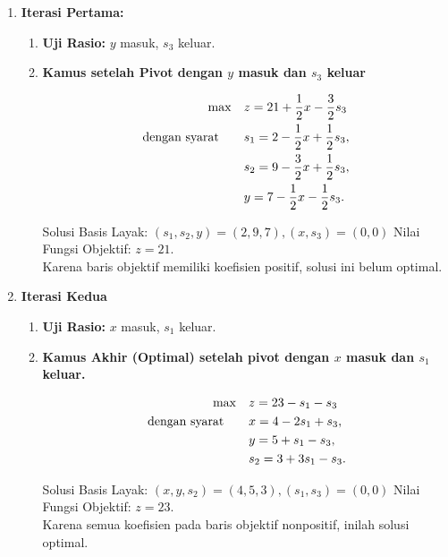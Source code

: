 \begin{enumerate}
    \item \textbf{Iterasi Pertama:}
\begin{enumerate}
    \item \textbf{Uji Rasio:} \( y \) masuk, \( s_3 \) keluar.

    \item \textbf{Kamus setelah Pivot dengan \( y \) masuk dan \( s_3 \) keluar}  
    \begin{tcolorbox}[colback=blue!5!white, colframe=blue!75!black,    
    width=0.6\textwidth, %
    box align=center, 
    title=\textbf{Kamus Kedua}]
    \[
    \begin{aligned}
    \max \quad & z = 21 + \frac{1}{2}x - \frac{3}{2}s_3 \\
    \mbox{dengan syarat}\quad \quad 
    & s_1 = 2 - \frac{1}{2}x + \frac{1}{2}s_3, \\
    & s_2 = 9 - \frac{3}{2}x + \frac{1}{2}s_3, \\
    & y = 7 - \frac{1}{2}x - \frac{1}{2}s_3.
    \end{aligned}
    \]
    \end{tcolorbox}
    Solusi Basis Layak: \( (s_1, s_2, y) = (2,9,7), (x,s_3) = (0,0) \)  
    Nilai Fungsi Objektif: \( z = 21 \).\\ 
    Karena baris objektif memiliki koefisien positif, solusi ini belum optimal.  
    \end{enumerate}
    \item \textbf{Iterasi Kedua}
    \begin{enumerate}
    \item \textbf{Uji Rasio:} \( x \) masuk, \( s_1 \) keluar.

    \item \textbf{Kamus Akhir (Optimal) setelah pivot dengan $x$ masuk dan $s_1$ keluar.} 
    \begin{tcolorbox}[colback=green!5!white, colframe=green!75!black,    
    width=0.6\textwidth, %
    box align=center, 
    title=\textbf{Kamus Akhir}] 
    \[
    \begin{aligned}
    \max \quad & z = 23 - s_1 - s_3 \\
    \mbox{dengan syarat}\quad \quad
    & x = 4 - 2s_1 + s_3, \\
    & y = 5 + s_1 - s_3, \\
    & s_2 = 3 + 3s_1 - s_3.
    \end{aligned}
    \]
    \end{tcolorbox}
    Solusi Basis Layak: \( (x,y,s_2) = (4,5,3), (s_1,s_3) = (0,0) \)  
    Nilai Fungsi Objektif: \( z = 23 \).\\ 
    Karena semua koefisien pada baris objektif nonpositif, inilah solusi optimal.
    \end{enumerate}
\end{enumerate}

